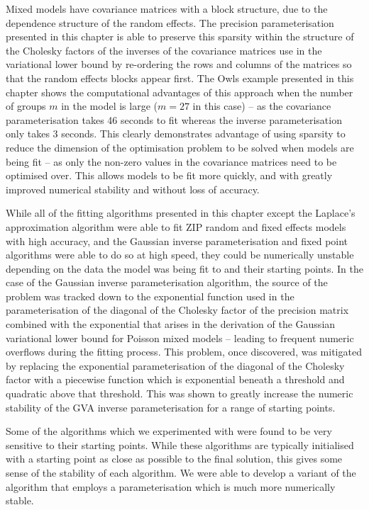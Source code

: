 Mixed models have covariance matrices with a block structure, due to the
dependence structure of the random effects. The precision parameterisation
presented in this chapter is able to preserve this sparsity within the
structure of the Cholesky factors of the inverses of the covariance matrices
use in the variational lower bound by re-ordering the rows and columns of the
matrices so that the random effects blocks appear first. The Owls example
presented in this chapter shows the computational advantages of this approach
when the number of groups $m$ in the model is large ($m=27$ in this case) -- as
the covariance parameterisation takes 46 seconds to fit whereas the inverse
parameterisation only takes 3 seconds. This clearly demonstrates advantage of
using sparsity to reduce the dimension of the optimisation problem to be solved
when models are being fit -- as only the non-zero values in the covariance
matrices need to be optimised over. This allows models to be fit more quickly,
and with greatly improved numerical stability and without loss of accuracy.

While all of the fitting algorithms presented in this chapter except the
Laplace's approximation algorithm were able to fit ZIP random and fixed effects
models with high accuracy, and the  Gaussian inverse parameterisation and fixed
point algorithms were able to do so at high speed, they  could be numerically
unstable depending on the data the model was being fit to and their starting
points. In the case of the Gaussian inverse parameterisation algorithm, the
source of the problem was tracked down to the exponential function used in the
parameterisation of the diagonal of the Cholesky factor of the precision matrix
combined with the exponential that arises in the derivation of the Gaussian
variational lower bound for Poisson mixed models -- leading to frequent numeric
overflows during the fitting process. This problem, once discovered, was
mitigated by replacing the exponential parameterisation of the diagonal of the
Cholesky factor with a piecewise function which is exponential beneath a
threshold and quadratic above that threshold. This was shown to greatly
increase the numeric stability of the GVA inverse parameterisation for a range
of starting points.

Some of the algorithms which we experimented with were found to be very
sensitive to their starting points.  While these algorithms are typically
initialised with a starting point as close as possible to the final solution,
this gives some sense of the stability of each algorithm. We were able to
develop a variant of the algorithm that employs a parameterisation which is
much more numerically stable.

